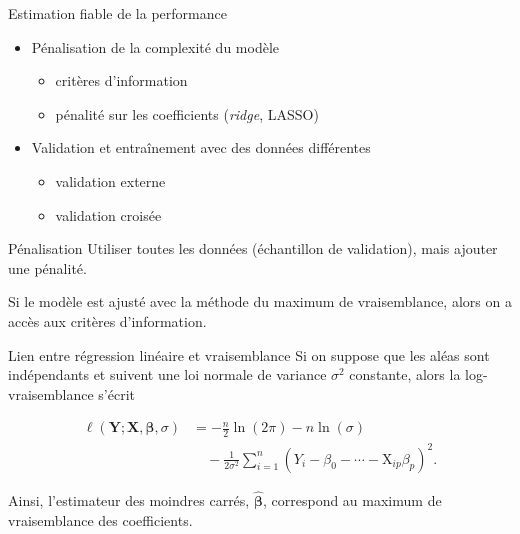 \documentclass[
  ignorenonframetext,
]{beamer}
\providecommand{\tightlist}{%
  \setlength{\itemsep}{0pt}\setlength{\parskip}{0pt}}\usepackage{longtable,booktabs,array}
\begin{document}
\begin{frame}{Estimation fiable de la performance}
\label{estimation-fiable-de-la-performance}
\begin{itemize}
\tightlist
\item
  Pénalisation de la complexité du modèle

  \begin{itemize}
  \tightlist
  \item
    critères d'information
  \item
    pénalité sur les coefficients (\emph{ridge}, LASSO)
  \end{itemize}
\item
  Validation et entraînement avec des données différentes

  \begin{itemize}
  \tightlist
  \item
    validation externe
  \item
    validation croisée
  \end{itemize}
\end{itemize}
\end{frame}

\begin{frame}{Pénalisation}
\label{puxe9nalisation}
Utiliser toutes les données (échantillon de validation), mais ajouter
une pénalité.

Si le modèle est ajusté avec la méthode du maximum de vraisemblance,
alors on a accès aux critères d'information.
\end{frame}

\begin{frame}{Lien entre régression linéaire et vraisemblance}
\label{lien-entre-ruxe9gression-linuxe9aire-et-vraisemblance}
Si on suppose que les aléas sont indépendants et suivent une loi normale
de variance \(\sigma^2\) constante, alors la log-vraisemblance s'écrit

\begin{align*}
\ell(\boldsymbol{Y}; \mathbf{X}, \boldsymbol{\beta}, \sigma) & = -\frac{n}{2}\ln(2\pi) -n\ln(\sigma) \\&\quad - \frac{1}{2\sigma^2}\sum_{i=1}^n (Y_i - \beta_0 - \cdots - \mathrm{X}_{ip}\beta_p)^2.
\end{align*}

Ainsi, l'estimateur des moindres carrés,
\(\widehat{\boldsymbol{\beta}}\), correspond au maximum de vraisemblance
des coefficients.
\end{frame}
\end{document}
